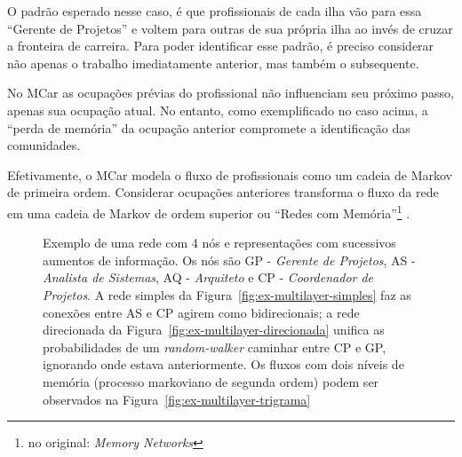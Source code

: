 \documentclass[12pt,a4paper]{article}
\begin{document}
O padrão esperado nesse caso, é que profissionais de cada ilha vão para essa \enquote{Gerente de Projetos} e voltem para outras de sua própria ilha ao invés de cruzar a fronteira de carreira. Para poder identificar esse padrão, é preciso considerar não apenas o trabalho imediatamente anterior, mas também o subsequente.

No MCar as ocupações prévias do profissional não influenciam seu próximo passo, apenas sua ocupação atual. No entanto, como exemplificado no caso acima, a \enquote{perda de memória} da ocupação anterior compromete a identificação das comunidades.

Efetivamente, o MCar modela o fluxo de profissionais como um cadeia de Markov de primeira ordem. Considerar ocupações anteriores transforma o fluxo da rede em uma cadeia de Markov de ordem superior ou \enquote{Redes com Memória}\footnote{no original: \textit{Memory Networks}} \cite{Edler2017-kt}.

\begin{figure}[htb]
    \centering
    \caption{Exemplo de uma rede com 4 nós e representações com sucessivos aumentos de informação. Os nós são GP - \textit{Gerente de Projetos}, AS - \textit{Analista de Sistemas}, AQ - \textit{Arquiteto} e CP - \textit{Coordenador de Projetos}. A rede simples da Figura~\ref{fig:ex-multilayer-simples} faz as conexões entre AS e CP agirem como bidirecionais; a rede direcionada da Figura~\ref{fig:ex-multilayer-direcionada} unifica as probabilidades de um \textit{random-walker} caminhar entre CP e GP, ignorando onde estava anteriormente. Os fluxos com dois níveis de memória (processo markoviano de segunda ordem) podem ser observados na Figura~\ref{fig:ex-multilayer-trigrama}}
\end{figure}
\end{document}
